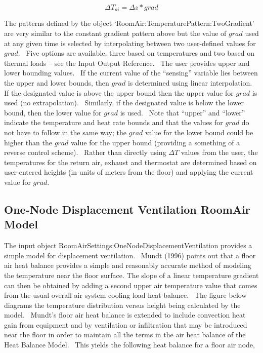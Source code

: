\begin{equation}
\Delta {T_{ai}} = \Delta z * grad
\end{equation}

The patterns defined by the object `RoomAir:TemperaturePattern:TwoGradient' are very similar to the constant gradient pattern above but the value of \(grad\) used at any given time is selected by interpolating between two user-defined values for \(grad\).~ Five options are available, three based on temperatures and two based on thermal loads -- see the Input Output Reference.~ The user provides upper and lower bounding values.~ If the current value of the ``sensing'' variable lies between the upper and lower bounds, then \(grad\) is determined using linear interpolation.~ If the designated value is above the upper bound then the upper value for \(grad\) is used (no extrapolation).~ Similarly, if the designated value is below the lower bound, then the lower value for \(grad\) is used.~ Note that ``upper'' and ``lower'' indicate the temperature and heat rate bounds and that the values for \(grad\) do not have to follow in the same way; the \(grad\) value for the lower bound could be higher than the \(grad\) value for the upper bound (providing a something of a reverse control scheme).~ Rather than directly using \(\Delta T\) values from the user, the temperatures for the return air, exhaust and thermostat are determined based on user-entered heights (in units of meters from the floor) and applying the current value for \(grad\).

\subsection{One-Node Displacement Ventilation RoomAir Model}\label{one-node-displacement-ventilation-roomair-model}

The input object RoomAirSettings:OneNodeDisplacementVentilation provides a simple model for displacement ventilation.~ Mundt (1996) points out that a floor air heat balance provides a simple and reasonably accurate method of modeling the temperature near the floor surface. The slope of a linear temperature gradient can then be obtained by adding a second upper air temperature value that comes from the usual overall air system cooling load heat balance.~ The figure below diagrams the temperature distribution versus height being calculated by the model.~ Mundt's floor air heat balance is extended to include convection heat gain from equipment and by ventilation or infiltration that may be introduced near the floor in order to maintain all the terms in the air heat balance of the Heat Balance Model.~ This yields the following heat balance for a floor air node,

